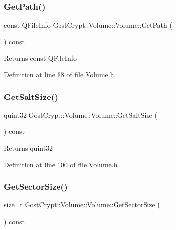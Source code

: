 \subsubsection{\texorpdfstring{Get\+Path()}{GetPath()}}
{\footnotesize\ttfamily const Q\+File\+Info Gost\+Crypt\+::\+Volume\+::\+Volume\+::\+Get\+Path (\begin{DoxyParamCaption}{ }\end{DoxyParamCaption}) const\hspace{0.3cm}{\ttfamily [inline]}}

\begin{DoxyReturn}{Returns}
const Q\+File\+Info 
\end{DoxyReturn}


Definition at line 88 of file Volume.\+h.

\mbox{\label{class_gost_crypt_1_1_volume_1_1_volume_a40ac7e74eb8fc575cff3813638b9ad54}} 
\subsubsection{\texorpdfstring{Get\+Salt\+Size()}{GetSaltSize()}}
{\footnotesize\ttfamily quint32 Gost\+Crypt\+::\+Volume\+::\+Volume\+::\+Get\+Salt\+Size (\begin{DoxyParamCaption}{ }\end{DoxyParamCaption}) const\hspace{0.3cm}{\ttfamily [inline]}}

\begin{DoxyReturn}{Returns}
quint32 
\end{DoxyReturn}


Definition at line 100 of file Volume.\+h.

\mbox{\label{class_gost_crypt_1_1_volume_1_1_volume_ab78b80e0baf91e1fe0f367f0064da492}} 
\subsubsection{\texorpdfstring{Get\+Sector\+Size()}{GetSectorSize()}}
{\footnotesize\ttfamily size\+\_\+t Gost\+Crypt\+::\+Volume\+::\+Volume\+::\+Get\+Sector\+Size (\begin{DoxyParamCaption}{ }\end{DoxyParamCaption}) const\hspace{0.3cm}{\ttfamily [inline]}}

